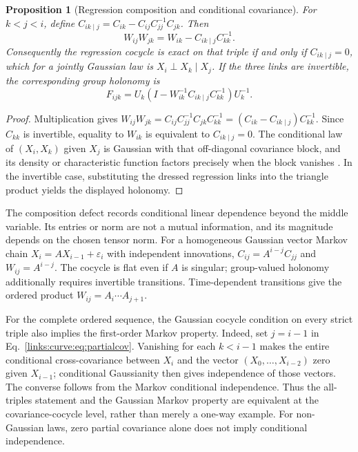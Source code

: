 \documentclass[11pt]{article}
\newtheorem{proposition}[theorem]{Proposition}
\theoremstyle{definition}
\theoremstyle{remark}
\begin{document}
\begin{proposition}[Regression composition and conditional covariance]
\label{links:curve:prop:markov}
For $k<j<i$, define $C_{ik\mid j}=C_{ik}-C_{ij}C_{jj}^{-1}C_{jk}$. Then
\begin{equation}
W_{ij}W_{jk}=W_{ik}-C_{ik\mid j}C_{kk}^{-1}.
\label{links:curve:eq:partialcov}
\end{equation}
Consequently the regression cocycle is exact on that triple if and only if $C_{ik\mid j}=0$, which for a jointly Gaussian law is $X_i\perp X_k\mid X_j$. If the three links are invertible, the corresponding group holonomy is
\begin{equation}
F_{ijk}=U_k\left(I-W_{ik}^{-1}C_{ik\mid j}C_{kk}^{-1}\right)U_k^{-1}.
\label{links:curve:eq:regression_holonomy}
\end{equation}
\end{proposition}
\begin{proof}
Multiplication gives
$W_{ij}W_{jk}=C_{ij}C_{jj}^{-1}C_{jk}C_{kk}^{-1}=(C_{ik}-C_{ik\mid j})C_{kk}^{-1}$.
Since $C_{kk}$ is invertible, equality to $W_{ik}$ is equivalent to $C_{ik\mid j}=0$. The conditional law of $(X_i,X_k)$ given $X_j$ is Gaussian with that off-diagonal covariance block, and its density or characteristic function factors precisely when the block vanishes \cite{links:lauritzen1996}. In the invertible case, substituting the dressed regression links into the triangle product yields the displayed holonomy.
\end{proof}

The composition defect records conditional linear dependence beyond the middle variable. Its entries or norm are not a mutual information, and its magnitude depends on the chosen tensor norm. For a homogeneous Gaussian vector Markov chain $X_i=A X_{i-1}+\varepsilon_i$ with independent innovations, $C_{ij}=A^{i-j}C_{jj}$ and $W_{ij}=A^{i-j}$. The cocycle is flat even if $A$ is singular; group-valued holonomy additionally requires invertible transitions. Time-dependent transitions give the ordered product $W_{ij}=A_i\cdots A_{j+1}$.

For the complete ordered sequence, the Gaussian cocycle condition on every strict triple also implies the first-order Markov property. Indeed, set $j=i-1$ in Eq.~\eqref{links:curve:eq:partialcov}. Vanishing for each $k<i-1$ makes the entire conditional cross-covariance between $X_i$ and the vector $(X_0,\ldots,X_{i-2})$ zero given $X_{i-1}$; conditional Gaussianity then gives independence of those vectors. The converse follows from the Markov conditional independence. Thus the all-triples statement and the Gaussian Markov property are equivalent at the covariance-cocycle level, rather than merely a one-way example. For non-Gaussian laws, zero partial covariance alone does not imply conditional independence.
\end{document}
